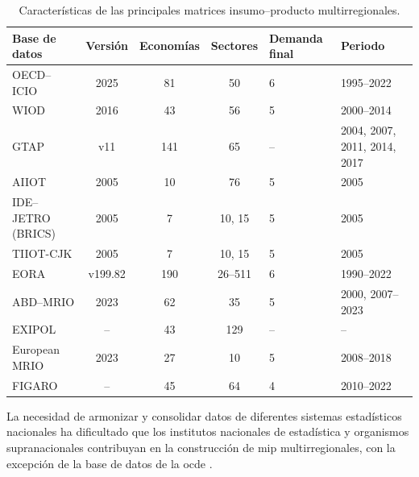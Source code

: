 \begin{table}[h]
\centering
\caption{Características de las principales matrices insumo--producto multirregionales.}
\label{tab_MRIOT}
\begin{tabular}{@{} p{4cm} c c c p{2cm} p{2cm} @{}} 
\hline
\textbf{Base de datos} & \multicolumn{1}{l}{\textbf{Versión}} & \multicolumn{1}{l}{\textbf{Economías}} & \multicolumn{1}{l}{\textbf{Sectores}} & \textbf{Demanda final} & \textbf{Periodo} \\ \hline
OECD--ICIO & 2025 & 81 & 50 & 6 & 1995--2022 \\
WIOD & 2016 & 43 & 56 & 5 & 2000--2014 \\
GTAP & v11 & 141 & 65 & -- & 2004, 2007, 2011, 2014, 2017 \\
AIIOT & 2005 & 10 & 76 & 5 & 2005 \\
IDE--JETRO (BRICS) & 2005 & 7 & 10, 15 & 5 & 2005 \\
TIIOT-CJK & 2005 & 7 & 10, 15 & 5 & 2005 \\
EORA & v199.82 & 190 & 26--511 & 6 & 1990--2022 \\
ABD--MRIO & 2023 & 62 & 35 & 5 & 2000, 2007--2023 \\
EXIPOL & -- & 43 & 129 & -- & -- \\
European MRIO &  2023 & 27 & 10 &  5 &  2008--2018\\
FIGARO & -- & 45 & 64 & 4 & 2010--2022 \\ \hline
\end{tabular}
\end{table}


La necesidad de armonizar y consolidar datos de diferentes sistemas estadísticos nacionales ha dificultado que los institutos nacionales de estadística y organismos supranacionales contribuyan en la construcción de \gls{mip} multirregionales, con la excepción de la base de datos de la \gls{ocde} \parencite[p.~7]{Tukker2013}. 

